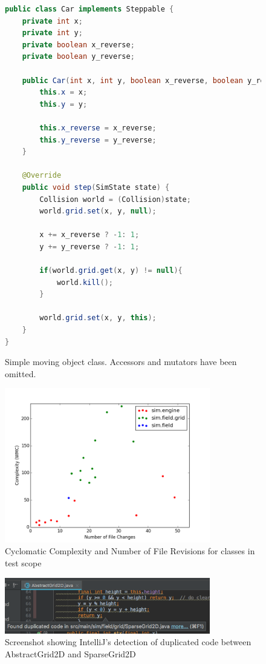 \documentclass[11pt]{article}
\begin{document}
\begin{figure}[htp]
\begin{lstlisting}[language=Java]
public class Car implements Steppable {
	private int x;
	private int y;
	private boolean x_reverse;
	private boolean y_reverse;

	public Car(int x, int y, boolean x_reverse, boolean y_reverse){
		this.x = x;
		this.y = y;

		this.x_reverse = x_reverse;
		this.y_reverse = y_reverse;
	}

	@Override
	public void step(SimState state) {
		Collision world = (Collision)state;
		world.grid.set(x, y, null);

		x += x_reverse ? -1: 1;
		y += y_reverse ? -1: 1;

		if(world.grid.get(x, y) != null){
			world.kill();
		}

		world.grid.set(x, y, this);
	}
}

\end{lstlisting}

\caption{Simple moving object class. Accessors and mutators have been omitted.}
\label{code:car_class}
\end{figure}

\begin{figure}[htp]
\centering
\includegraphics[width=0.8\textwidth]{Appendix/complexityVchange}
\caption{Cyclomatic Complexity and Number of File Revisions for classes in test scope}
\label{fig:complexityVchange}
\end{figure}

\begin{figure}[htp]
\centering
\includegraphics[width=0.8\textwidth]{Appendix/duplicated_code}
\caption{Screenshot showing IntelliJ's detection of duplicated code between AbstractGrid2D and SparseGrid2D}
\label{fig:dupe_code}
\end{figure}
\end{document}
